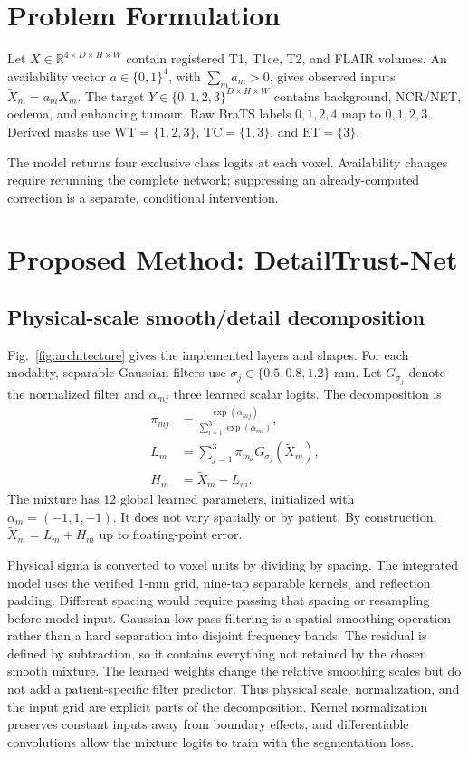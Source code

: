 \documentclass[conference]{IEEEtran}
\begin{document}
\section{Problem Formulation}
Let $X\in\mathbb R^{4\times D\times H\times W}$ contain registered T1, T1ce, T2, and FLAIR volumes. An availability vector $a\in\{0,1\}^4$, with $\sum_m a_m>0$, gives observed inputs $\tilde X_m=a_mX_m$. The target $Y\in\{0,1,2,3\}^{D\times H\times W}$ contains background, NCR/NET, oedema, and enhancing tumour. Raw BraTS labels $0,1,2,4$ map to $0,1,2,3$. Derived masks use $\mathrm{WT}=\{1,2,3\}$, $\mathrm{TC}=\{1,3\}$, and $\mathrm{ET}=\{3\}$.

The model returns four exclusive class logits at each voxel. Availability changes require rerunning the complete network; suppressing an already-computed correction is a separate, conditional intervention.

\section{Proposed Method: DetailTrust-Net}
\subsection{Physical-scale smooth/detail decomposition}
Fig.~\ref{fig:architecture} gives the implemented layers and shapes. For each modality, separable Gaussian filters use $\sigma_j\in\{0.5,0.8,1.2\}$ mm. Let $G_{\sigma_j}$ denote the normalized filter and $\alpha_{mj}$ three learned scalar logits. The decomposition is
\begin{align}
\pi_{mj}&=\frac{\exp(\alpha_{mj})}{\sum_{l=1}^{3}\exp(\alpha_{ml})},\nonumber\\
L_m&=\sum_{j=1}^{3}\pi_{mj}G_{\sigma_j}(\tilde X_m),\nonumber\\
H_m&=\tilde X_m-L_m.
\label{eq:split}
\end{align}
The mixture has 12 global learned parameters, initialized with $\alpha_m=(-1,1,-1)$. It does not vary spatially or by patient. By construction, $\tilde X_m=L_m+H_m$ up to floating-point error.

Physical sigma is converted to voxel units by dividing by spacing. The integrated model uses the verified 1-mm grid, nine-tap separable kernels, and reflection padding. Different spacing would require passing that spacing or resampling before model input. Gaussian low-pass filtering is a spatial smoothing operation rather than a hard separation into disjoint frequency bands. The residual is defined by subtraction, so it contains everything not retained by the chosen smooth mixture. The learned weights change the relative smoothing scales but do not add a patient-specific filter predictor. Thus physical scale, normalization, and the input grid are explicit parts of the decomposition. Kernel normalization preserves constant inputs away from boundary effects, and differentiable convolutions allow the mixture logits to train with the segmentation loss.
\end{document}
